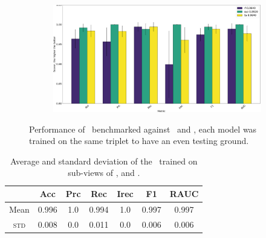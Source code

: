 \begin{figure}[!h]
\begin{subfigure}{0.49\linewidth}
		\subcaption{\an, \cnmod, \phin}
	\end{subfigure}
	\begin{subfigure}{0.49\linewidth}
		\includegraphics[width=\linewidth]{img/Bn_Cnmod_Phi_ta.png}
		\subcaption{\bn, \cnmod, \phin}
	\end{subfigure}
	\caption{Performance of \tas\ benchmarked against \rfs\ and \svcs, each model was trained on
		the same triplet to have an even testing ground.} \label{fig:triplets-performance}
\end{figure}
\begin{table}[!h]
	\caption{Average and standard deviation of the \ta\ trained on sub-views of \an, \bn and
		\cnmod.}\label{tbl:an-bn-cnmod-ta-perf}

	\bigskip
	\setlength{\tabcolsep}{6pt}
	\centering
	\begin{tabular}{ccccccc}
		\toprule
		\textbf{}    & \textbf{Acc} & \textbf{Prc} & \textbf{Rec} & \textbf{Irec} & \textbf{F1} & \textbf{RAUC} \\
		\midrule
		Mean         & 0.996        & 1.0          & 0.994        & 1.0           & 0.997
		             & 0.997                                                                                    \\
		\textsc{std} & 0.008        & 0.0          & 0.011        & 0.0           & 0.006
		             & 0.006                                                                                    \\
		\bottomrule
	\end{tabular}
\end{table}


